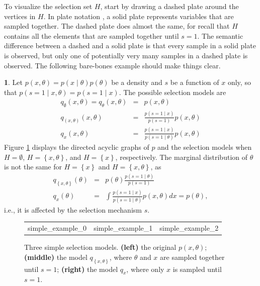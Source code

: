 \documentclass{article}
\theoremstyle{plain}
\theoremstyle{definition}
\newtheorem{example}[theorem]{\protect\examplename}
\providecommand{\examplename}{Example}
\begin{document}
To visualize the selection set $H$, start by drawing a dashed plate around the vertices in $H$. In plate notation \citep{buntine1994operations}, a solid plate represents variables that are sampled together. The
dashed plate does almost the same, for recall that $H$ contains all the elements that are sampled together until $s=1$. The semantic difference between a dashed and a solid plate is that every sample in a solid plate is observed, but only one of potentially very many samples in a dashed plate is observed. The following bare-bones example should make things clear.
\begin{example}\label{exa:Marginal density of theta}
Let $p\left(x,\theta\right)=p\left(x\mid\theta\right)p\left(\theta\right)$
be a density and $s$ be a function of $x$ only, so that $p\left(s=1\mid x,\theta\right)=p\left(s=1\mid x\right)$.
The possible selection models are
\begin{eqnarray*}
q_{\emptyset}\left(x,\theta\right) = q_{\theta}\left(x,\theta\right) & = & p\left(x,\theta\right)\\
q_{\left(x,\theta\right)}\left(x,\theta\right) & = & \frac{p\left(s=1\mid x\right)}{p\left(s=1\right)}p\left(x,\theta\right)\\
q_{x}\left(x,\theta\right) & = & \frac{p\left(s=1\mid x\right)}{p\left(s=1\mid\theta\right)}p\left(x,\theta\right)
\end{eqnarray*}
Figure \ref{fig:Plate notation, simple example} displays the directed acyclic graphs of $p$ and the selection models when $H = \emptyset$, $H=\left\{ x,\theta\right\}$, and $H=\left\{ x\right\}$, respectively. The marginal distribution of $\theta$ is not the same for $H=\left\{ x\right\}$ and $H=\left\{ x,\theta\right\} $, as
\begin{eqnarray*}
q_{\left\{ x,\theta\right\} }\left(\theta\right) & = & p\left(\theta\right)\frac{p\left(s=1\mid\theta\right)}{p\left(s=1\right)}\\
q_{x}\left(\theta\right) & = & \int\frac{p\left(s=1\mid x\right)}{p\left(s=1\mid\theta\right)}p\left(x,\theta\right)dx=p\left(\theta\right),
\end{eqnarray*}
i.e., it is affected by the selection mechanism $s$.
\end{example}

\begin{figure}
\begin{center}     
 \begin{tabular}{ccc}   
  {simple_example_0} &   
   {simple_example_1} & 
   {simple_example_2}
 \end{tabular} 
\end{center}

\caption{\label{fig:Plate notation, simple example} Three simple selection models. {\bf (left)} the original $p\left(x,\theta\right)$; {\bf (middle)} the model $q_{\left\{ x,\theta\right\} }$, where $\theta$ and $x$ are
sampled together until $s=1$; {\bf (right)} the model $q_{x}$, where only $x$ is sampled until $s=1$.}
\end{figure}
\end{document}

